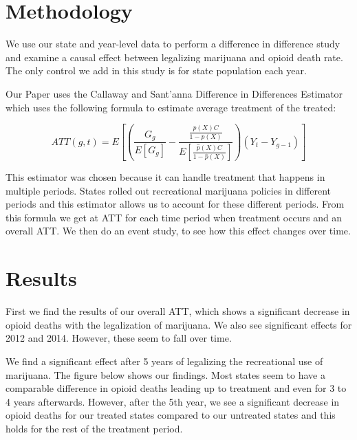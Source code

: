 \documentclass{article}
\begin{document}





\section*{Methodology} %

We use our state and year-level data to perform a difference in difference study and examine a causal effect between legalizing marijuana and opioid death rate. The only control we add in this study is for state population each year. 

Our Paper uses the Callaway and Sant'anna Difference in Differences Estimator which uses the following formula to estimate average treatment of the treated:

$$ATT(g,t)=E[(  \frac{G_g}{ E[G_g]} - \frac{ \frac{ \hat{p} (X)C}{1- \hat{p} (X)}}{E [\frac{\hat{p} (X) C } {1 - \hat{p} (X)}]}) (Y_t - Y_{g-1})]$$

This estimator was chosen because it can handle treatment that happens in multiple periods. States rolled out recreational marijuana policies in different periods and this estimator allows us to account for these different periods. From this formula we get at ATT for each time period when treatment occurs and an overall ATT. We then do an event study, to see how this effect changes over time.

\section*{Results}

First we find the results of our overall ATT, which shows a significant decrease in opioid deaths with the legalization of marijuana. We also see significant effects for 2012 and 2014. However, these seem to fall over time.



We find a significant effect after 5 years of legalizing the recreational use of marijuana. The figure below shows our findings. Most states seem to have a comparable difference in opioid deaths leading up to treatment and even for 3 to 4 years afterwards. However, after the 5th year, we see a significant decrease in opioid deaths for our treated states compared to our untreated states and this holds for the rest of the treatment period. 
\end{document}
